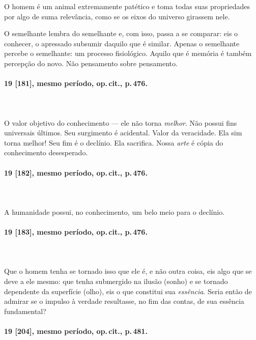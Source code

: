 O homem é um animal extremamente patético e toma todas suas propriedades
por algo de suma relevância, como se os eixos do universo girassem
nele.

O semelhante lembra do semelhante e, com isso, passa a se comparar: eis
o conhecer, o apressado subsumir daquilo que é similar. Apenas o
semelhante percebe o semelhante: um processo fisiológico. Aquilo que é
memória é também percepção do novo. Não pensamento sobre pensamento.

\pagebreak
\paragraph*{19 [181], mesmo período, op.\,cit., p.\,476.}
\ \\
\ \\

O valor objetivo do conhecimento --- ele não torna \textit{melhor}. Não
possui fins universais últimos. Seu surgimento é acidental. Valor da
veracidade. Ela sim torna melhor! Seu fim é o declínio. Ela
sacrifica. Nossa \textit{arte} é cópia do conhecimento desesperado.

\pagebreak
\paragraph*{19 [182], mesmo período, op.\,cit., p.\,476.}
\ \\
\ \\

A humanidade possui, no conhecimento, um belo meio para o declínio. 

\pagebreak
\paragraph*{19 [183], mesmo período, op.\,cit., p.\,476.}
\ \\
\ \\

Que o homem tenha se tornado isso que ele é, e não outra coisa, eis
algo que se deve a ele mesmo: que tenha submergido na ilusão
(sonho) e se tornado dependente da superfície (olho), eis o que
constitui sua \textit{essência}. Seria então de admirar se o impulso à
verdade resultasse, no fim das contas, de sua essência fundamental? 

\pagebreak
\paragraph*{19 [204], mesmo período, op.\,cit., p.\,481.}
\ \\
\ \\

